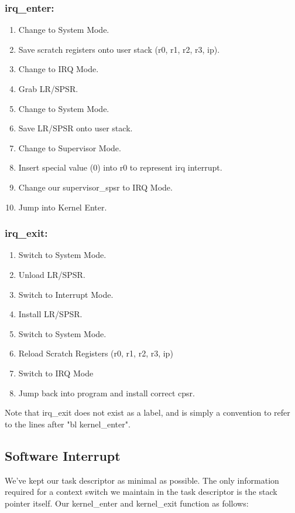 \documentclass{article}
\begin{document}
\subsubsection{irq\_enter:}
\begin{enumerate}
    \item Change to System Mode.
    \item Save scratch registers onto user stack (r0, r1, r2, r3, ip).
    \item Change to IRQ Mode.
    \item Grab LR/SPSR.
    \item Change to System Mode. 
    \item Save LR/SPSR onto user stack.
    \item Change to Supervisor Mode.
    \item Insert special value (0) into r0 to represent irq interrupt.
    \item Change our supervisor\_spsr to IRQ Mode.
    \item Jump into Kernel Enter.
\end{enumerate}

\subsubsection{irq\_exit:}
\begin{enumerate}
    \item Switch to System Mode.
    \item Unload LR/SPSR.
    \item Switch to Interrupt Mode.
    \item Install LR/SPSR.
    \item Switch to System Mode.
    \item Reload Scratch Registers (r0, r1, r2, r3, ip)
    \item Switch to IRQ Mode
    \item Jump back into program and install correct cpsr.
\end{enumerate}

Note that irq\_exit does not exist as a label, and is simply a convention to refer to the lines after "bl kernel\_enter".

\subsection{Software Interrupt}

We've kept our task descriptor as minimal as possible. The only information required for a context switch we maintain in the task descriptor is the stack pointer itself. Our kernel\_enter and kernel\_exit function as follows:
\end{document}
